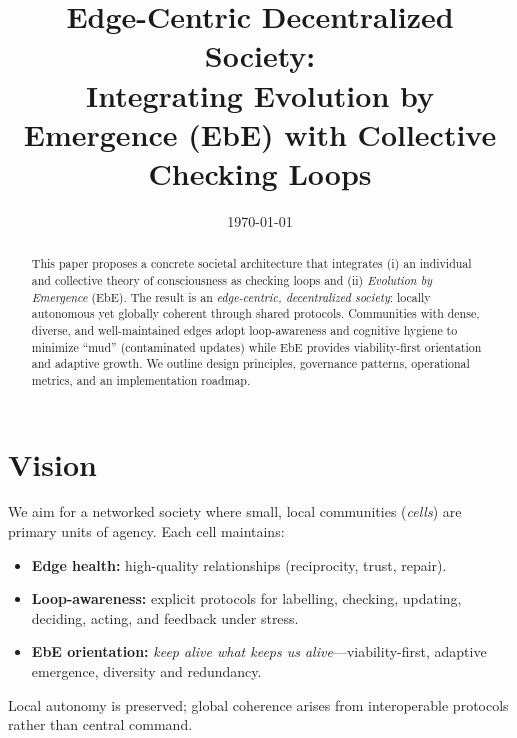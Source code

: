 \documentclass[11pt,a4paper]{article}
\title{\textbf{Edge-Centric Decentralized Society:\\
Integrating Evolution by Emergence (EbE) with Collective Checking Loops}}
\author{}
\date{\today}
\begin{document}
\maketitle
\onehalfspacing

\begin{abstract}
This paper proposes a concrete societal architecture that integrates (i) an individual and collective theory of consciousness as checking loops and (ii) \emph{Evolution by Emergence} (EbE). The result is an \emph{edge-centric, decentralized society}: locally autonomous yet globally coherent through shared protocols. Communities with dense, diverse, and well-maintained edges adopt loop-awareness and cognitive hygiene to minimize ``mud'' (contaminated updates) while EbE provides viability-first orientation and adaptive growth. We outline design principles, governance patterns, operational metrics, and an implementation roadmap.
\end{abstract}

\section{Vision}
We aim for a networked society where small, local communities (\emph{cells}) are primary units of agency. Each cell maintains:
\begin{itemize}
  \item \textbf{Edge health:} high-quality relationships (reciprocity, trust, repair).
  \item \textbf{Loop-awareness:} explicit protocols for labelling, checking, updating, deciding, acting, and feedback under stress.
  \item \textbf{EbE orientation:} \emph{keep alive what keeps us alive}---viability-first, adaptive emergence, diversity and redundancy.
\end{itemize}
Local autonomy is preserved; global coherence arises from interoperable protocols rather than central command.
\end{document}
